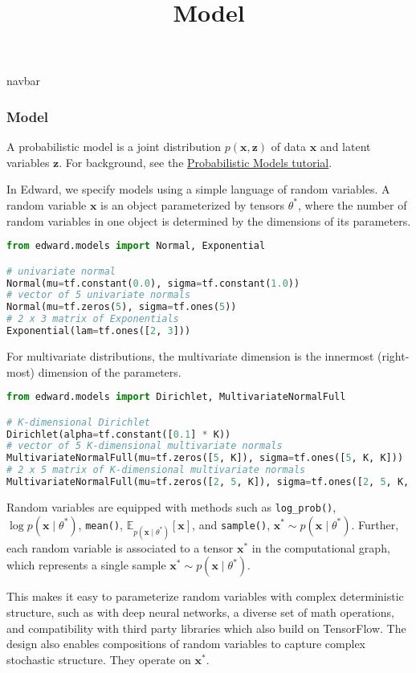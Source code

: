 \title{Model}

{{navbar}}

\subsubsection{Model}

A probabilistic model is a joint distribution $p(\mathbf{x},
\mathbf{z})$ of data $\mathbf{x}$ and latent variables $\mathbf{z}$.
For background, see the \href{/tutorials/model}{Probabilistic Models tutorial}.

In Edward, we specify models using a simple language of random variables.
A random variable $\mathbf{x}$ is an object parameterized by
tensors $\theta^*$, where
the number of random variables in one object is determined by
the dimensions of its parameters.

\begin{lstlisting}[language=Python]
from edward.models import Normal, Exponential

# univariate normal
Normal(mu=tf.constant(0.0), sigma=tf.constant(1.0))
# vector of 5 univariate normals
Normal(mu=tf.zeros(5), sigma=tf.ones(5))
# 2 x 3 matrix of Exponentials
Exponential(lam=tf.ones([2, 3]))
\end{lstlisting}

For multivariate distributions, the multivariate dimension is the
innermost (right-most) dimension of the parameters.

\begin{lstlisting}[language=Python]
from edward.models import Dirichlet, MultivariateNormalFull

# K-dimensional Dirichlet
Dirichlet(alpha=tf.constant([0.1] * K))
# vector of 5 K-dimensional multivariate normals
MultivariateNormalFull(mu=tf.zeros([5, K]), sigma=tf.ones([5, K, K]))
# 2 x 5 matrix of K-dimensional multivariate normals
MultivariateNormalFull(mu=tf.zeros([2, 5, K]), sigma=tf.ones([2, 5, K, K]))
\end{lstlisting}

Random variables are equipped with methods such as
\texttt{log_prob()}, $\log p(\mathbf{x}\mid\theta^*)$,
\texttt{mean()}, $\mathbb{E}_{p(\mathbf{x}\mid\theta^*)}[\mathbf{x}]$,
and \texttt{sample()}, $\mathbf{x}^*\sim p(\mathbf{x}\mid\theta^*)$.
Further, each random variable is associated to a tensor $\mathbf{x}^*$ in the
computational graph, which represents a single sample $\mathbf{x}^*\sim
p(\mathbf{x}\mid\theta^*)$.

This makes it easy to parameterize random variables with complex
deterministic structure, such as with deep neural networks, a diverse
set of math operations, and compatibility with third party libraries
which also build on TensorFlow.
The design also enables compositions of random variables
to capture complex stochastic structure.
They operate on $\mathbf{x}^*$.

